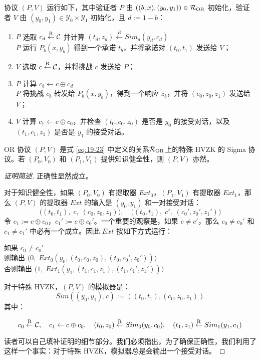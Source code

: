 协议 $(P,V)$ 运行如下，其中验证者 $P$ 由 $((b,x),(y_0,y_1))\in\mathcal{R}_{\rm OR}$ 初始化，验证者 $V$ 由 $(y_0,y_1)\in\mathcal{Y}_0\times\mathcal{Y}_1$ 初始化，且 $d:=1-b$：
\begin{enumerate}
	\item $P$ 选取 $c_d\overset{\rm R}\leftarrow\mathcal{C}$ 并计算 $(t_d,z_d)\overset{R}\leftarrow Sim_d(y_d,c_d)$\\$P$ 运行 $P_b(x,y_b)$ 得到一个承诺 $t_b$，并将承诺对 $(t_0,t_1)$ 发送给 $V$；
	\item $V$ 选取 $c\overset{\rm R}\leftarrow\mathcal{C}$，并将挑战 $c$ 发送给 $P$；
	\item $P$ 计算 $c_b\leftarrow c\oplus c_d$\\$P$ 将挑战 $c_b$ 转发给 $P_b(x,y_b)$，得到一个响应 $z_b$，并将 $(c_0,z_0,z_1)$ 发送给 $V$；
	\item $V$ 计算 $c_1\leftarrow c\oplus c_0$，并检查 $(t_0,c_0,z_0)$ 是否是 $y_0$ 的接受对话，以及 $(t_1,c_1,z_1)$ 是否是 $y_1$ 的接受对话。
\end{enumerate}

\begin{theorem}
OR 协议 $(P,V)$ 是式 \ref{eq:19-23} 中定义的关系$\mathcal{R}_{\rm OR}$上的特殊 HVZK 的 Sigma 协议。若 $(P_0,V_0)$ 和 $(P_1,V_1)$ 提供知识健全性，则 $(P, V)$ 亦然。
\end{theorem}

\begin{proof}[证明简述]
正确性显然成立。

对于知识健全性，如果 $(P_0,V_0)$ 有提取器 $Ext_0$，$(P_1,V_1)$ 有提取器 $Ext_1$，那么 $(P, V)$ 的提取器 $Ext$ 的输入是 $(y_0,y_1)$ 和一对接受对话：
\[
\big((t_0,t_1),\;c,\;(c_0,z_0,z_1)\big),
\quad
\big((t_0,t_1),\;c',\;(c_0',z_0',z_1')\big)
\]
令 $c_1:=c\oplus c_0$，$c_1':=c\oplus c_0'$。一个重要的观察是，如果 $c\neq c'$，那么 $c_0\neq c_0'$ 和 $c_1\neq c_1'$ 中必有一个成立。因此 $Ext$ 按如下方式运行：

\vspace{8pt}

\hspace*{30pt} 如果 $c_0\neq c_0'$\\
\hspace*{90pt} 则输出 $\Big(0,\;Ext_0(y_0,(t_0,c_0,z_0),(t_0,c_0',z_0'))\Big)$\\
\hspace*{90pt} 否则输出 $\Big(1,\;Ext_1(y_1,(t_1,c_1,z_1),(t_1,c_1',z_1'))\Big)$

\vspace{8pt}

对于特殊 HVZK，$(P, V)$ 的模拟器是：
\[
Sim((y_0,y_1),c):=((t_0,t_1),(c_0,z_0,z_1))
\]
其中：

\[
c_0\overset{\rm R}\leftarrow\mathcal{C},
\quad
c_1\leftarrow c\oplus c_0,
\quad
(t_0,z_0)\overset{\rm R}\leftarrow Sim_0(y_0,c_0),
\quad
(t_1,z_1)\overset{\rm R}\leftarrow Sim_1(y_1,c_1)
\]

读者可以自己填补证明的细节部分。我们必须指出，为了确保正确性，我们利用了这样一个事实：对于特殊 HVZK，模拟器总是会输出一个接受对话。
\end{proof}
